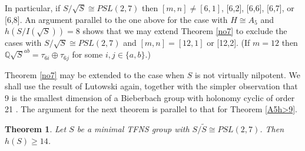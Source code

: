 \documentclass[12pt]{amsart}
\renewcommand{\geq}{\geqslant}
\newtheorem{theorem}{Theorem}
\begin{document}
In particular,  if $S/\sqrt{S}\cong{PSL(2,7)}$
then $[m,n]\not=[6,1]$,  [6,2],  [6,6], [6,7], or [6,8].
An argument parallel to the one above for the case with $H\cong{A_5}$ and 
$h(S/I(\sqrt{S}))=8$ shows that we may extend Theorem \ref{no7} to exclude 
the cases with $S/\sqrt{S}\cong{PSL(2,7)}$ and $[m,n]=[12,1]$ or [12,2].
(If  $m=12$ then 
$\mathbb{Q}\sqrt{S}^{ab}=\tau_{6i}\oplus\tau_{6j}$ for some $i,j\in\{a,b\}$.)

Theorem \ref{no7} may be extended to the case when $S$ is not virtually nilpotent.
We shall use the result of Lutowski \cite{Lu23} again, 
together with the simpler observation
that 9 is the smallest dimension of a Bieberbach group with holonomy
cyclic  of order 21 \cite{KP}.
The argument for the next theorem is parallel to that for Theorem \ref{A5h>9}.

\begin{theorem}
\label{vmetabPSL(2,7)}
Let $S$ be a minimal TFNS group with $S/\widetilde{S}\cong{PSL(2,7)}$.
Then $h(S)\geq14$.
\end{theorem}
\end{document}
